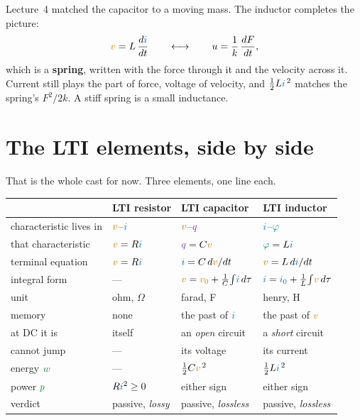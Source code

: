 \documentclass[11pt,a4paper]{article}
\newcommand{\Icol}[1]{\textcolor{ccur}{#1}}
\newcommand{\Vcol}[1]{\textcolor{cvolt}{#1}}
\newcommand{\Pcol}[1]{\textcolor{cpow}{#1}}
\newcommand{\Qcol}[1]{\textcolor{ccharge}{#1}}
\newcommand{\Fcol}[1]{\textcolor{cflux}{#1}}
\begin{document}
\begin{ideabox}
Lecture~4 matched the capacitor to a moving mass. The inductor completes the picture:
\[
  \Vcol{v} = L\,\frac{d\Icol{i}}{dt}
  \qquad\longleftrightarrow\qquad
  u = \frac{1}{k}\,\frac{dF}{dt} ,
\]
which is a \textbf{spring}, written with the force through it and the velocity across it.
Current still plays the part of force, voltage of velocity, and
$\tfrac12 L\Icol{i}^{\,2}$ matches the spring's $F^2/2k$. A stiff spring is a small
inductance.
\end{ideabox}

\section{The LTI elements, side by side}
\label{sec:table}

That is the whole cast for now. Three elements, one line each.

\begin{center}
\footnotesize
\renewcommand{\arraystretch}{1.10}
\begin{tabular}{@{}l l l l@{}}
\toprule
 & \textbf{LTI resistor} & \textbf{LTI capacitor} & \textbf{LTI inductor}\\
\midrule
characteristic lives in
   & $\Vcol{v}$--$\Icol{i}$ & $\Vcol{v}$--$\Qcol{q}$ & $\Icol{i}$--$\Fcol{\varphi}$\\
that characteristic
   & $\Vcol{v} = R\Icol{i}$ & $\Qcol{q} = C\Vcol{v}$ & $\Fcol{\varphi} = L\Icol{i}$\\
terminal equation
   & $\Vcol{v} = R\Icol{i}$
   & $\Icol{i} = C\,d\Vcol{v}/dt$
   & $\Vcol{v} = L\,d\Icol{i}/dt$\\
integral form
   & --- & $\Vcol{v} = \Vcol{v_0} + \frac1C\!\int\!\Icol{i}\,d\tau$
        & $\Icol{i} = \Icol{i_0} + \frac1L\!\int\!\Vcol{v}\,d\tau$\\
unit
   & ohm, $\Omega$ & farad, F & henry, H\\
memory
   & none & the past of $\Icol{i}$ & the past of $\Vcol{v}$\\
at DC it is
   & itself & an \emph{open} circuit & a \emph{short} circuit\\
cannot jump
   & --- & its voltage & its current\\
energy $\Pcol{w}$
   & --- & $\tfrac12 C\Vcol{v}^{\,2}$ & $\tfrac12 L\Icol{i}^{\,2}$\\
power $\Pcol{p}$
   & $R\Icol{i}^2 \ge 0$ & either sign & either sign\\
verdict
   & passive, \emph{lossy} & passive, \emph{lossless} & passive, \emph{lossless}\\
\bottomrule
\end{tabular}
\end{center}
\vspace{3pt}
\end{document}
